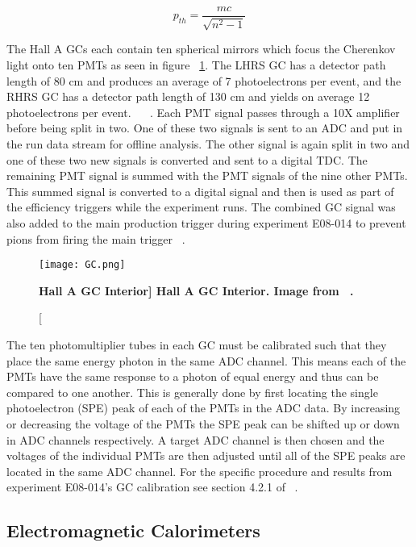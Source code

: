\begin{equation} \label{eq:momentum_threshold}
	p_{th} = \frac{mc}{\sqrt{n^2-1}}
\end{equation}

The Hall A GCs each contain ten spherical mirrors which focus the Cherenkov light onto ten PMTs as seen in figure ~\ref{fig:gc}. The LHRS GC has a detector path length of 80 cm and produces an average of 7 photoelectrons per event, and the RHRS GC has a detector path length of 130 cm and yields on average 12 photoelectrons per event. ~\cite{Article:HallA} ~\cite{Article:GC}. Each PMT signal passes through a 10X amplifier before being split in two. One of these two signals is sent to an ADC and put in the run data stream for offline analysis. The other signal is again split in two and one of these two new signals is converted and sent to a digital TDC. The remaining PMT signal is summed with the PMT signals of the nine other PMTs. This summed signal is converted to a digital signal and then is used as part of the efficiency triggers while the experiment runs. The combined GC signal was also added to the main production trigger during experiment E08-014 to prevent pions from firing the main trigger ~\cite{Thesis:Ye}.

\begin{figure}[!ht]
\begin{center}
\texttt{[image: GC.png]}
\end{center}
\caption[\bf{Hall A GC Interior}]{
{\bf{Hall A GC Interior.}} Image from ~\cite{Thesis:Ye}.}
\label{fig:gc}
\end{figure}

The ten photomultiplier tubes in each GC must be calibrated such that they place the same energy photon in the same ADC channel. This means each of the PMTs have the same response to a photon of equal energy and thus can be compared to one another. This is generally done by first locating the single photoelectron (SPE) peak of each of the PMTs in the ADC data. By increasing or decreasing the voltage of the PMTs the SPE peak can be shifted up or down in ADC channels respectively. A target ADC channel is then chosen and the voltages of the individual PMTs are then adjusted until all of the SPE peaks are located in the same ADC channel. For the specific procedure and results from experiment E08-014's GC calibration see section 4.2.1 of ~\cite{Thesis:Ye}.

\subsection{Electromagnetic Calorimeters}
\label{ssec:em_cal}

